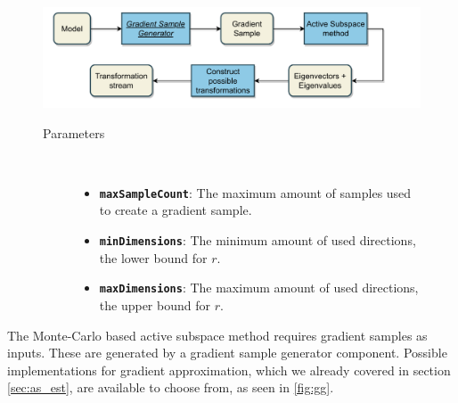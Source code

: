\documentclass[
  a4paper,  %
  twoside,  %
  bibliography=totoc,
  headsepline,
  cleardoublepage=empty,
  parskip=half,
  draft=false
]{scrbook}
\begin{document}
\begin{mdframed}[style=style,frametitle={Transformation stream generator (active subspaces)}]
\begin{figure}[H]
\vspace{5px}
\includegraphics[width=\textwidth]{graphics/TransformationStreamGen_AS.pdf}

\delimit

\begin{description}
\item[Parameters] {~ \begin{itemize}[\indent{}]
\item \texttt{\textbf{maxSampleCount}}: The maximum amount of samples used to create a gradient sample.
\item \texttt{\textbf{minDimensions}}: The minimum amount of used directions, \ie the lower bound for $r$.
\item \texttt{\textbf{maxDimensions}}: The maximum amount of used directions, \ie the upper bound for $r$.
\end{itemize}}
\end{description}
\delimit
{}
\label{fig:astsg}
\end{figure}
\end{mdframed}
%
The Monte-Carlo based active subspace method requires gradient samples as inputs.
These are generated by a gradient sample generator component.
Possible implementations for gradient approximation, which we already covered in section \cref{sec:as_est}, are available to choose from, as seen in \cref{fig:gg}.
\end{document}
